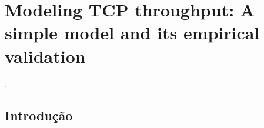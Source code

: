 
\chapter{Modeling TCP throughput: A simple model and its empirical validation}
 \cite{padhye1998modeling}.


\section*{Introdução}
